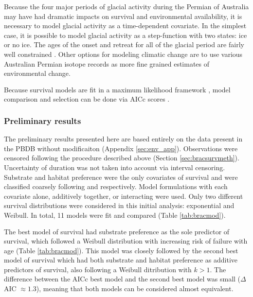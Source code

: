 \documentclass[12pt,letterpaper]{article}
\begin{document}
Because the four major periods of glacial activity during the Permian of Australia may have had dramatic impacts on survival and environmental availability, it is necessary to model glacial activity as a time-dependent covariate. In the simplest case, it is possible to model glacial activity as a step-function with two states: ice or no ice. The ages of the onset and retreat for all of the glacial period are fairly well constrained \citep{Fielding2008,Fielding2008a}. Other options for modeling climatic change are to use various Australian Permian isotope records \citep{Birgenheier2010} as more fine grained estimates of environmental change. 

Because survival models are fit in a maximum likelihood framework \citep{Kleinbaum2005}, model comparison and selection can be done via AICc scores \citep{Hurvich1989,Burnham2002a}.


\subsubsection{Preliminary results} \label{sec:bracsurvres}
The preliminary results presented here are based entirely on the data present in the PBDB without modificaiton (Appendix \ref{sec:env_app}). Observations were censored following the procedure described above (Section \ref{sec:bracsurvmeth}). Uncertainty of duration was not taken into account via interval censoring. Substrate and habitat preference were the only covariates of survival and were classified coarsely following \citet{Foote2006} and \citet{Kiessling2007} respectively. Model formulations with each covariate alone, additively together, or interacting were used. Only two different survival distributions were considered in this initial analysis: exponential and Weibull. In total, 11 models were fit and compared (Table \ref{tab:bracmod}). 

The best model of survival had substrate preference as the sole predictor of survival, which followed a Weibull distribution with increasing risk of failure with age (Table \ref{tab:bracmod}). This model was closely followed by the second best model of survival which had both substrate and habitat preference as additive predictors of survival, also following a Weibull ditribution with \(k > 1\). The difference between the AICc best model and the second best model was small (\(\Delta\) AIC \(\approx 1.3\)), meaning that both models can be considered almost equivalent. 
\end{document}
